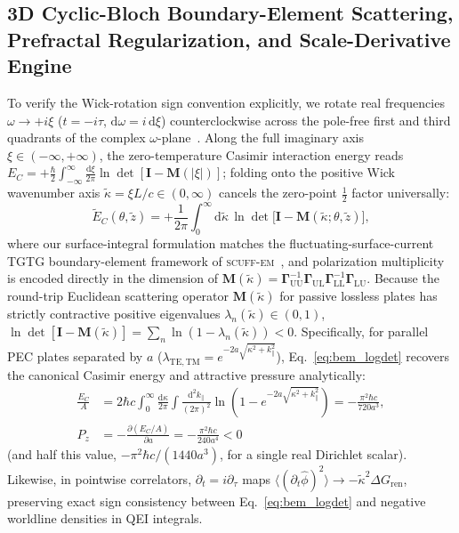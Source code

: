 \documentclass[aps,prd,twocolumn,10pt,showkeys,nofootinbib,floatfix,longbibliography]{revtex4-2}
\newcommand{\dd}{\mathrm{d}}
\begin{document}
\subsection{3D Cyclic-Bloch Boundary-Element Scattering, Prefractal Regularization, and Scale-Derivative Engine}
\label{subsec:methods_bem}
To verify the Wick-rotation sign convention explicitly, we rotate real frequencies $\omega \to +i\xi$ ($t = -i\tau$, $\dd\omega = i\,\dd\xi$) counterclockwise across the pole-free first and third quadrants of the complex $\omega$-plane~\cite{bordag2009,reid2009,reid2013,reid2015scuff}. Along the full imaginary axis $\xi \in (-\infty, +\infty)$, the zero-temperature Casimir interaction energy reads $E_C = +\frac{\hbar}{2}\int_{-\infty}^{\infty}\frac{\dd\xi}{2\pi}\ln\det[\mathbf{I} - \mathbf{M}(|\xi|)]$; folding onto the positive Wick wavenumber axis $\tilde{\kappa} = \xi L / c \in (0, \infty)$ cancels the zero-point $\frac{1}{2}$ factor universally:
\begin{equation}
\tilde{E}_C(\theta, \tilde{z}) = +\frac{1}{2\pi} \int_0^\infty \dd\tilde{\kappa} \, \ln\det\bigl[\mathbf{I} - \mathbf{M}(\tilde{\kappa}; \theta, \tilde{z})\bigr],
\label{eq:bem_logdet}
\end{equation}
where our surface-integral formulation matches the fluctuating-surface-current TGTG boundary-element framework of \textsc{scuff-em}~\cite{reid2009,reid2013,reid2015scuff}, and polarization multiplicity is encoded directly in the dimension of $\mathbf{M}(\tilde{\kappa}) = \mathbf{\Gamma}_{\mathrm{UU}}^{-1}\mathbf{\Gamma}_{\mathrm{UL}}\mathbf{\Gamma}_{\mathrm{LL}}^{-1}\mathbf{\Gamma}_{\mathrm{LU}}$. Because the round-trip Euclidean scattering operator $\mathbf{M}(\tilde{\kappa})$ for passive lossless plates has strictly contractive positive eigenvalues $\lambda_n(\tilde{\kappa}) \in (0,1)$, $\ln\det[\mathbf{I} - \mathbf{M}(\tilde{\kappa})] = \sum_n \ln(1 - \lambda_n(\tilde{\kappa})) < 0$. Specifically, for parallel PEC plates separated by $a$ ($\lambda_{\mathrm{TE},\mathrm{TM}} = e^{-2a\sqrt{\kappa^2 + k_\parallel^2}}$), Eq.~\eqref{eq:bem_logdet} recovers the canonical Casimir energy and attractive pressure analytically:
\begin{align*}
\frac{E_C}{A} &= 2\hbar c \int_0^\infty \frac{\dd\kappa}{2\pi}\int \frac{\dd^2 k_\parallel}{(2\pi)^2}\ln\!\left(1 - e^{-2a\sqrt{\kappa^2 + k_\parallel^2}}\right) = -\frac{\pi^2\hbar c}{720 a^3}, \\
P_z &= -\frac{\partial(E_C/A)}{\partial a} = -\frac{\pi^2\hbar c}{240 a^4} < 0
\end{align*}
(and half this value, $-\pi^2\hbar c/(1440 a^3)$, for a single real Dirichlet scalar). Likewise, in pointwise correlators, $\partial_t = i\partial_\tau$ maps $\langle(\partial_t\hat{\phi})^2\rangle \to -\tilde{\kappa}^2\Delta G_{\mathrm{ren}}$, preserving exact sign consistency between Eq.~\eqref{eq:bem_logdet} and negative worldline densities in QEI integrals.
\end{document}
